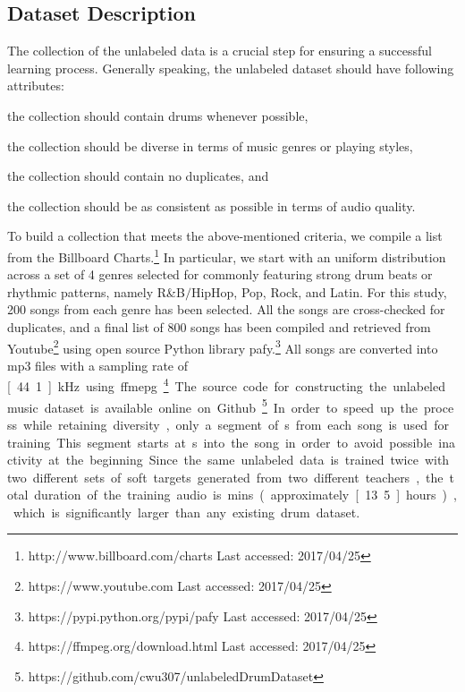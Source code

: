 \documentclass{article}
\begin{document}
\subsection{Dataset Description}
The collection of the unlabeled data is a crucial step for ensuring a successful learning process. Generally speaking, the unlabeled dataset should have following attributes: 
\begin{inparaenum}[(i)]
    \item   the collection should contain drums whenever possible,
    \item   the collection should be diverse in terms of music genres or playing styles,
    \item   the collection should contain no duplicates, and
    \item   the collection should be as consistent as possible in terms of audio quality. 
\end{inparaenum}
To build a collection that meets the above-mentioned criteria, we compile a list from the Billboard Charts.\footnote{http://www.billboard.com/charts Last accessed: 2017/04/25} In particular, we start with an uniform distribution across a set of 4 genres selected for commonly featuring strong drum beats or rhythmic patterns, namely R\&B$\slash$HipHop, Pop, Rock, and Latin. For this study, 200 songs from each genre has been selected. All the songs are cross-checked for duplicates, and a final list of 800 songs has been compiled and retrieved from Youtube\footnote{https://www.youtube.com Last accessed: 2017/04/25} using open source Python library pafy.\footnote{https://pypi.python.org/pypi/pafy Last accessed: 2017/04/25} All songs are converted into mp3 files with a sampling rate of \unit[44.1]{kHz} using ffmepg.\footnote{https://ffmpeg.org/download.html Last accessed: 2017/04/25} The source code for constructing the unlabeled music dataset is available online on Github.\footnote{https://github.com/cwu307/unlabeledDrumDataset} In order to speed up the process while retaining diversity, only a segment of \unit[30]{s} from each song is used for training. This segment starts at \unit[30]{s} into the song in order to avoid possible inactivity at the beginning. Since the same unlabeled data is trained twice with two different sets of soft targets generated from two different teachers, the total duration of the training audio is \unit[800]{mins} (approximately \unit[13.5]{hours}), which is significantly larger than any existing drum dataset. 
\end{document}
